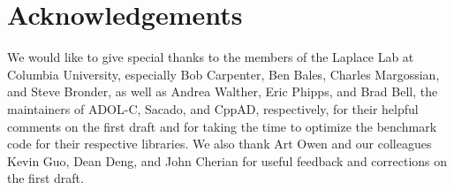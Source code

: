 \section{Acknowledgements}

We would like to give special thanks to the members of the Laplace Lab at Columbia University,
especially Bob Carpenter, Ben Bales, Charles Margossian, and Steve Bronder,
as well as Andrea Walther, Eric Phipps, and Brad Bell,
the maintainers of ADOL-C, Sacado, and CppAD, respectively,
for their helpful comments on the first draft and 
for taking the time to optimize the benchmark code for their respective libraries.
We also thank Art Owen and our colleagues Kevin Guo, Dean Deng, and John Cherian
for useful feedback and corrections on the first draft.
